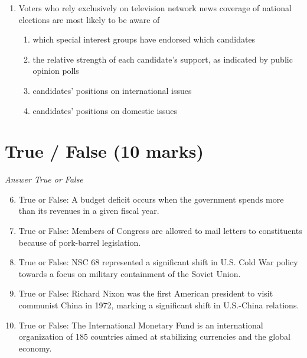 \documentclass[12pt]{article}
\begin{document}
\begin{enumerate}[label=\arabic*.]
\begin{enumerate}[label=(\alph*)]
    \item Moving the Department of Defense Intelligence Agencies to the CIA for better coordination
    \item Creation of the National Intelligence Director
    \item Moving the domestic intelligence component of the FBI to the CIA
\end{enumerate}
\item Voters who rely exclusively on television network news coverage of national elections are most likely to be aware of
\begin{enumerate}[label=(\alph*)]
    \item which special interest groups have endorsed which candidates
    \item the relative strength of each candidate's support, as indicated by public opinion polls
    \item candidates' positions on international issues
    \item candidates' positions on domestic issues
\end{enumerate}
\end{enumerate}

\section*{True / False (10 marks)}
\textit{Answer True or False}
\begin{enumerate}[label=\arabic*.]
\setcounter{enumi}{5}
\item True or False: A budget deficit occurs when the government spends more than its revenues in a given fiscal year.
\item True or False: Members of Congress are allowed to mail letters to constituents because of pork-barrel legislation.
\item True or False: NSC 68 represented a significant shift in U.S. Cold War policy towards a focus on military containment of the Soviet Union.
\item True or False: Richard Nixon was the first American president to visit communist China in 1972, marking a significant shift in U.S.-China relations.
\item True or False: The International Monetary Fund is an international organization of 185 countries aimed at stabilizing currencies and the global economy.
\end{enumerate}
\end{document}
